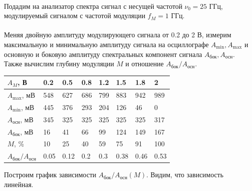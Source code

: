 \documentclass[a4paper,12pt]{article} %
\begin{document}
\paragraph{} Подадим на анализатор спектра сигнал с несущей частотой $\nu_0 = 25$ ГГц, модулируемый сигналом с частотой модуляции $f_M = 1$ ГГц.

\paragraph{} Меняя двойную амплитуду модулирующего сигнала от 0.2 до 2 В, измерим максимальную и минимальную амплитуду сигнала на осциллографе $A_{\min}, A_{\max}$ и основную и боковую амплитуду спектральных компонент сигнала $A_{\text{бок}}, A_\text{осн}$. Также вычислим глубину модуляции $M$ и отношение $A_\text{бок}/A_\text{осн}$.

\begin{table}[h]
\begin{center}
\begin{tabularx}{\textwidth}{|l|Y|Y|Y|Y|Y|Y|Y|}
\hline
$A_M$, В & 0.2 & 0.5 & 0.8 & 1.2 & 1.5 & 1.8 & 2 \\ \hline
$A_{\max}$, мВ & 548 & 627 & 686 & 799 & 883 & 942 & 989 \\ \hline
$A_{\min}$, мВ & 445 & 376 & 293 & 204 & 126 & 46 & 0 \\ \hline
$A_\text{осн}$, мВ & 345 & 325 & 325 & 325 & 325 & 325& 317 \\ \hline
$A_\text{бок}$, мВ  & 16 & 41 & 66 & 99 & 124 & 149 & 167 \\ \hline
$M$, \% & 10 & 25 & 40 & 59 & 75 & 91 & 100 \\ \hline
$A_\text{бок}/A_\text{осн}$ & 0.05 & 0.12 & 0.2 & 0.3 & 0.38 & 0.46 & 0.53 \\ \hline
\end{tabularx}
\end{center}
\end{table}

Построим график зависимости $A_\text{бок}/A_\text{осн}(M)$. Видим, что зависимость линейная.
\end{document}
